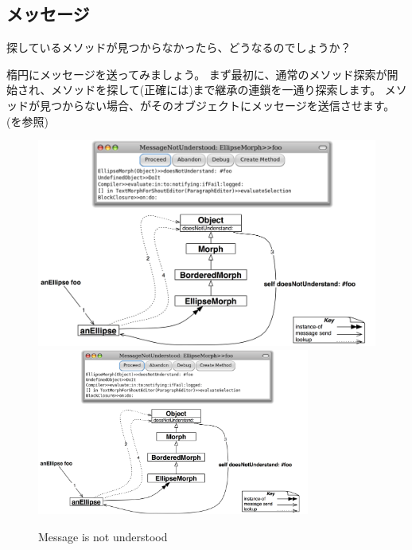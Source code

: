 \documentclass[a4paper,10pt,twoside]{book}
\begin{document}
\subsection{メッセージ}

探しているメソッドが見つからなかったら、どうなるのでしょうか？

楕円にメッセージを送ってみましょう。
まず最初に、通常のメソッド探索が開始され、メソッドを探して(正確には)まで継承の連鎖を一通り探索します。
メソッドが見つからない場合、がそのオブジェクトにメッセージを送信させます。(を参照)

\begin{figure}[htb]
\begin{center}
\ifluluelse
	{\includegraphics[width=\textwidth]{fooNotFound}}
	{\includegraphics[width=0.8\textwidth]{fooNotFound}}
\caption{Message  is not understood}
\end{center}
\end{figure}
\end{document}
